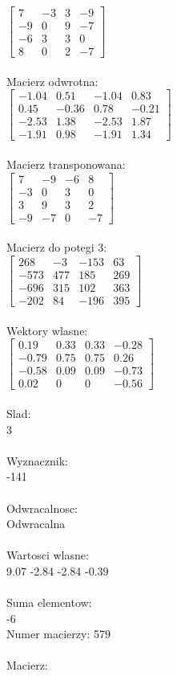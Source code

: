\documentclass[a4paper,12pt]{article}
\begin{document}
$\begin{bmatrix} 7&-3&3&-9\\-9&0&9&-7\\-6&3&3&0\\8&0&2&-7 \end{bmatrix}$
\\
\\
Macierz odwrotna:\\

$\begin{bmatrix} -1.04&0.51&-1.04&0.83\\0.45&-0.36&0.78&-0.21\\-2.53&1.38&-2.53&1.87\\-1.91&0.98&-1.91&1.34 \end{bmatrix}$
\\
\\
Macierz transponowana:\\

$\begin{bmatrix} 7&-9&-6&8\\-3&0&3&0\\3&9&3&2\\-9&-7&0&-7 \end{bmatrix}$
\\
\\
Macierz do potegi 3:\\

$\begin{bmatrix} 268&-3&-153&63\\-573&477&185&269\\-696&315&102&363\\-202&84&-196&395 \end{bmatrix}$
\\
\\
Wektory wlasne:\\

$\begin{bmatrix} 0.19&0.33&0.33&-0.28\\-0.79&0.75&0.75&0.26\\-0.58&0.09&0.09&-0.73\\0.02&0&0&-0.56 \end{bmatrix}$
\\
\\
Slad:\\
3
\\
\\
Wyznacznik:\\
-141
\\
\\
Odwracalnosc:\\
Odwracalna
\\
\\
Wartosci wlasne:\\
9.07 -2.84 -2.84 -0.39
\\
\\
Suma elementow:\\
-6
\\
\newpage
Numer macierzy:
579
\\
\\
Macierz:\\
\end{document}
